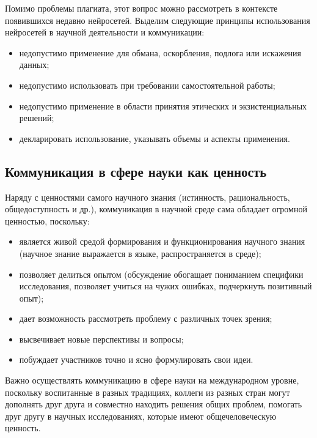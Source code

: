 Помимо проблемы плагиата, этот вопрос можно рассмотреть в контексте появившихся недавно нейросетей. Выделим следующие принципы использования нейросетей в научной деятельности и коммуникации:
\begin{itemize}
    \item недопустимо применение для обмана, оскорбления, подлога или искажения данных;
    \item недопустимо использовать при требовании самостоятельной работы;
    \item недопустимо применение в области принятия этических и экзистенциальных решений;
    \item декларировать использование, указывать объемы и аспекты применения.
\end{itemize}

\subsection{Коммуникация в сфере науки как ценность}

Наряду с ценностями самого научного знания (истинность, рациональность, общедоступность и др.), коммуникация в научной среде сама обладает огромной ценностью, поскольку:
\begin{itemize}
    \item является живой средой формирования и функционирования научного знания
    (научное знание выражается в языке, распространяется в среде);
    \item позволяет делиться опытом (обсуждение обогащает пониманием специфики исследования, позволяет учиться на чужих ошибках, подчеркнуть позитивный опыт);
    \item дает возможность рассмотреть проблему с различных точек зрения;
    \item высвечивает новые перспективы и вопросы;
    \item побуждает участников точно и ясно формулировать свои идеи.
\end{itemize}
Важно осуществлять коммуникацию в сфере науки на международном уровне,
поскольку воспитанные в разных традициях, коллеги из разных стран могут дополнять друг 
друга и совместно находить решения общих проблем, помогать друг другу в научных исследованиях, которые имеют общечеловеческую ценность. 



